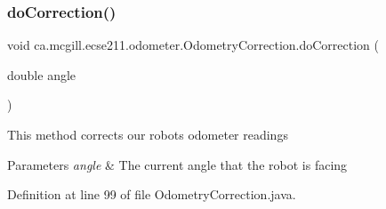 \subsubsection{\texorpdfstring{do\+Correction()}{doCorrection()}}
{\footnotesize\ttfamily void ca.\+mcgill.\+ecse211.\+odometer.\+Odometry\+Correction.\+do\+Correction (\begin{DoxyParamCaption}\item[{double}]{angle }\end{DoxyParamCaption})}

This method corrects our robot\textquotesingle{}s odometer readings


\begin{DoxyParams}{Parameters}
{\em angle} & The current angle that the robot is facing \\
\hline
\end{DoxyParams}


Definition at line 99 of file Odometry\+Correction.\+java.


